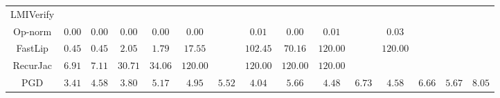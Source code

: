 \begin{table*}
{\begin{tabular}{c|c|c|c|c|c|c|c|c|c|c|c|c|c|c}
    LMIVerify &               &               &               &               &               &               &               &               &               &               &               &               &               &               \\
      Op-norm &        $0.00$ &        $0.00$ &        $0.00$ &        $0.00$ &        $0.00$ &               &        $0.01$ &        $0.00$ &        $0.01$ &               &        $0.03$ &               &               &               \\
      FastLip &        $0.45$ &        $0.45$ &        $2.05$ &        $1.79$ &       $17.55$ &               &      $102.45$ &       $70.16$ &      $120.00$ &               &      $120.00$ &               &               &               \\
     RecurJac &        $6.91$ &        $7.11$ &       $30.71$ &       $34.06$ &      $120.00$ &               &      $120.00$ &      $120.00$ &      $120.00$ &               &               &               &               &               \\
\hline
          PGD &        $3.41$ &        $4.58$ &        $3.80$ &        $5.17$ &        $4.95$ &        $5.52$ &        $4.04$ &        $5.66$ &        $4.48$ &        $6.73$ &        $4.58$ &        $6.66$ &        $5.67$ &        $8.05$ \\

    \bottomrule
    \end{tabular}
    \label{table:exp-A-average-radius-time-cifar10-8}
    }
\end{table*}
        
